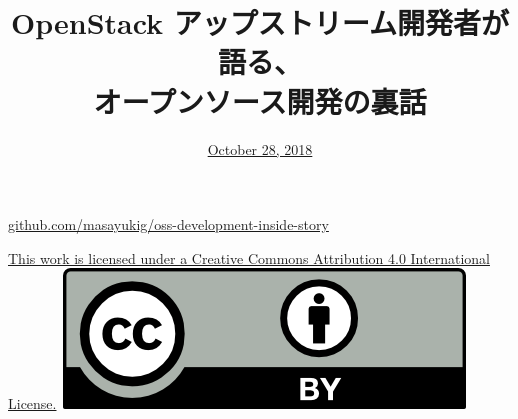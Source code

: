 \documentclass[aspectratio=169,11pt,hyperref={colorlinks=true}]{beamer}
\author[Masayuki Igawa]{%
    \texorpdfstring{%
        \begin{columns}
        \column{.7\linewidth}
            \centering
            Masayuki Igawa: \href{mailto:masayuki@igawa.io}{masayuki@igawa.io}\\
            \texttt{masayukig on
              \href{https://freenode.net/}{Freenode},
              \href{https://github.com/masayukig}{GitHub},
              \href{https://twitter.com/masayukig}{Twitter},
              \href{https://www.linkedin.com/in/masayukig/}{LinkedIn}}
        \end{columns}
        }
    {Masayuki Igawa}
}
\date{\href{https://events.opensuse.org/conference/summitasia18/program/proposal/2101}{October 28, 2018}}
\title[oss-development-inside-story
  \hspace{4em}\insertframenumber/\inserttotalframenumber]{OpenStack アップストリーム開発者が語る、\\
   オープンソース開発の裏話}
\begin{document}
{%
\begin{frame}[noframenumbering]
  \hypersetup{colorlinks,urlcolor=susedark}
  \titlepage{}
  \centering
  \@place \par
  \href{https://github.com/masayukig/oss-development-inside-story}{github.com/masayukig/oss-development-inside-story}
  \vspace{1em}
  \begin{flushright}
    \tiny\href{https://creativecommons.org/licenses/by/4.0/}{This work
      is licensed under a Creative Commons Attribution 4.0
      International License.}~\includegraphics[scale=0.3]{images/cc_by.png}
  \end{flushright}
\end{frame}
}
\end{document}
